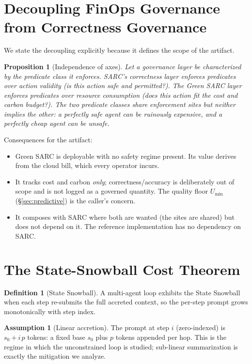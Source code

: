 \documentclass[11pt]{article}
\theoremstyle{plain}
\newtheorem{proposition}{Proposition}
\theoremstyle{definition}
\newtheorem{definition}{Definition}
\newtheorem{assumption}{Assumption}
\theoremstyle{remark}
\begin{document}
\section{Decoupling FinOps Governance from Correctness Governance}\label{sec:decouple}

We state the decoupling explicitly because it defines the scope of the artifact.

\begin{proposition}[Independence of axes]
Let a governance layer be characterized by the predicate class it enforces. SARC's correctness layer enforces predicates over \emph{action validity} (is this action safe and permitted?). The Green SARC layer enforces predicates over \emph{resource consumption} (does this action fit the cost and carbon budget?). The two predicate classes share enforcement sites but neither implies the other: a perfectly safe agent can be ruinously expensive, and a perfectly cheap agent can be unsafe.
\end{proposition}

\noindent Consequences for the artifact:
\begin{itemize}[leftmargin=1.4em,itemsep=2pt]
\item Green SARC is deployable with no safety regime present. Its value derives from the cloud bill, which every operator incurs.
\item It tracks cost and carbon \emph{only}; correctness/accuracy is deliberately out of scope and is not logged as a governed quantity. The quality floor $U_{\min}$ (\S\ref{sec:predictive}) is the caller's concern.
\item It composes with SARC where both are wanted (the sites are shared) but does not depend on it. The reference implementation has no dependency on SARC.
\end{itemize}

\section{The State-Snowball Cost Theorem}\label{sec:snowball}

\begin{definition}[State Snowball]
A multi-agent loop exhibits the State Snowball when each step re-submits the full accreted context, so the per-step prompt grows monotonically with step index.
\end{definition}

\begin{assumption}[Linear accretion]\label{asm:accretion}
The prompt at step $i$ (zero-indexed) is $s_0 + i\,p$ tokens: a fixed base $s_0$ plus $p$ tokens appended per hop. This is the regime in which the unconstrained loop is studied; sub-linear summarization is exactly the mitigation we analyze.
\end{assumption}
\end{document}

